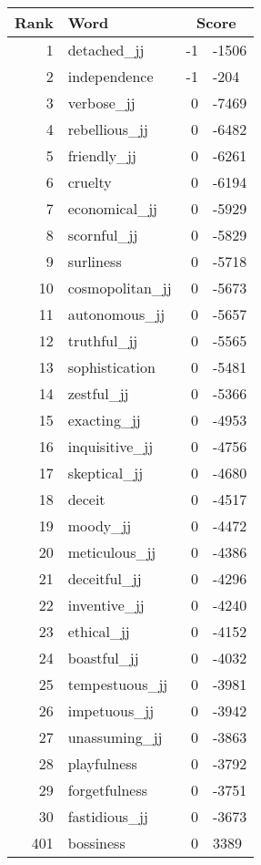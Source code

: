 \begin{longtable}[!htbp]{| rlr@{.}l |}
    \hline
    \textbf{Rank} & \textbf{Word} & \multicolumn{2}{c|}{\textbf{Score}} \\
    \hline
    \endhead
    1 & detached\_jj & -1 & -1506 \\
    2 & independence & -1 & -204 \\
    3 & verbose\_jj & 0 & -7469 \\
    4 & rebellious\_jj & 0 & -6482 \\
    5 & friendly\_jj & 0 & -6261 \\
    6 & cruelty & 0 & -6194 \\
    7 & economical\_jj & 0 & -5929 \\
    8 & scornful\_jj & 0 & -5829 \\
    9 & surliness & 0 & -5718 \\
    10 & cosmopolitan\_jj & 0 & -5673 \\
    11 & autonomous\_jj & 0 & -5657 \\
    12 & truthful\_jj & 0 & -5565 \\
    13 & sophistication & 0 & -5481 \\
    14 & zestful\_jj & 0 & -5366 \\
    15 & exacting\_jj & 0 & -4953 \\
    16 & inquisitive\_jj & 0 & -4756 \\
    17 & skeptical\_jj & 0 & -4680 \\
    18 & deceit & 0 & -4517 \\
    19 & moody\_jj & 0 & -4472 \\
    20 & meticulous\_jj & 0 & -4386 \\
    21 & deceitful\_jj & 0 & -4296 \\
    22 & inventive\_jj & 0 & -4240 \\
    23 & ethical\_jj & 0 & -4152 \\
    24 & boastful\_jj & 0 & -4032 \\
    25 & tempestuous\_jj & 0 & -3981 \\
    26 & impetuous\_jj & 0 & -3942 \\
    27 & unassuming\_jj & 0 & -3863 \\
    28 & playfulness & 0 & -3792 \\
    29 & forgetfulness & 0 & -3751 \\
    30 & fastidious\_jj & 0 & -3673 \\
    401 & bossiness & 0 & 3389 \\

\end{longtable}
